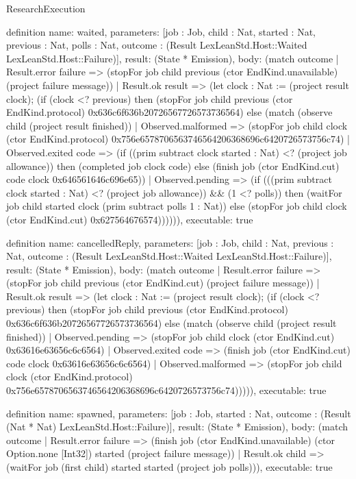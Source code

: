 \begin{lexlean}{ResearchExecution}
\begin{semanticmodule}
definition{
  name: waited,
  parameters: [job : Job, child : Nat, started : Nat, previous : Nat, polls : Nat, outcome : (Result LexLeanStd.Host::Waited LexLeanStd.Host::Failure)],
  result: (State * Emission),
  body: (match outcome
    | Result.error failure => (stopFor job child previous (ctor EndKind.unavailable) (project failure message))
    | Result.ok result => (let clock : Nat := (project result clock); (if (clock <? previous) then (stopFor job child previous (ctor EndKind.protocol) 0x636c6f636b20726567726573736564) else (match (observe child (project result finished))
      | Observed.malformed => (stopFor job child clock (ctor EndKind.protocol) 0x756e6578706563746564206368696c6420726573756c74)
      | Observed.exited code => (if ((prim subtract clock started : Nat) <? (project job allowance)) then (completed job clock code) else (finish job (ctor EndKind.cut) code clock 0x646561646c696e65))
      | Observed.pending => (if (((prim subtract clock started : Nat) <? (project job allowance)) && (1 <? polls)) then (waitFor job child started clock (prim subtract polls 1 : Nat)) else (stopFor job child clock (ctor EndKind.cut) 0x627564676574)))))),
  executable: true
}

definition{
  name: cancelledReply,
  parameters: [job : Job, child : Nat, previous : Nat, outcome : (Result LexLeanStd.Host::Waited LexLeanStd.Host::Failure)],
  result: (State * Emission),
  body: (match outcome
    | Result.error failure => (stopFor job child previous (ctor EndKind.cut) (project failure message))
    | Result.ok result => (let clock : Nat := (project result clock); (if (clock <? previous) then (stopFor job child previous (ctor EndKind.protocol) 0x636c6f636b20726567726573736564) else (match (observe child (project result finished))
      | Observed.pending => (stopFor job child clock (ctor EndKind.cut) 0x63616e63656c6c6564)
      | Observed.exited code => (finish job (ctor EndKind.cut) code clock 0x63616e63656c6c6564)
      | Observed.malformed => (stopFor job child clock (ctor EndKind.protocol) 0x756e6578706563746564206368696c6420726573756c74))))),
  executable: true
}

definition{
  name: spawned,
  parameters: [job : Job, started : Nat, outcome : (Result (Nat * Nat) LexLeanStd.Host::Failure)],
  result: (State * Emission),
  body: (match outcome
    | Result.error failure => (finish job (ctor EndKind.unavailable) (ctor Option.none [Int32]) started (project failure message))
    | Result.ok child => (waitFor job (first child) started started (project job polls))),
  executable: true
}


\end{semanticmodule}
\end{lexlean}
